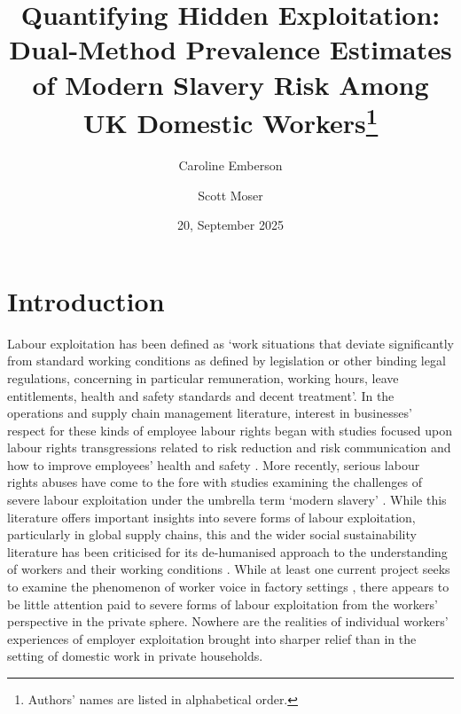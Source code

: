 \documentclass[
  12pt,
  letterpaper,
  DIV=11,
  numbers=noendperiod]{scrartcl}
\title{Quantifying Hidden Exploitation: Dual-Method Prevalence Estimates
of Modern Slavery Risk Among UK Domestic Workers\footnote{Authors' names
  are listed in alphabetical order.}}
\author{Caroline Emberson \and Scott Moser}
\date{20, September 2025}
\theoremstyle{plain}
\theoremstyle{definition}
\renewcommand*\contentsname{Table of contents}
\newcommand\contentsname{Table of contents}
\begin{document}
\maketitle

\renewcommand*\contentsname{Table of contents}
{
\hypersetup{linkcolor=}
\setcounter{tocdepth}{3}
\tableofcontents
}

\newpage

\section{Introduction}\label{introduction}

Labour exploitation has been defined as `work situations that deviate 
significantly from standard working conditions as defined by legislation
or other binding legal regulations, concerning in particular
remuneration, working hours, leave entitlements, health and safety
standards and decent treatment'\autocite[10]{european_union_for_fundamental_rights_severe_2015}. In the operations and supply chain management literature,
interest in businesses' respect for these kinds of employee labour rights began with
studies focused upon labour rights transgressions related to risk
reduction and risk communication and how to improve
employees' health and safety \autocite{chinander_aligning_2001,wolf_operationalizing_2001}. More recently, 
serious labour rights abuses have come to the fore with studies
examining the challenges of severe labour exploitation under the umbrella term `modern slavery' \autocite{gold_modern_2015,new_modern_2015,benstead_horizontal_2018,stevenson_modern_2018}. While this literature
offers important insights into severe forms of labour exploitation, particularly
in global supply chains, this and the wider social sustainability literature has
been criticised for its de-humanised approach to the understanding
of workers and their working conditions \autocite{soundararajan_humanizing_2021}. While at least one current
project seeks to examine the phenomenon of worker voice in factory
settings  \autocite{leverhulme_trust_research_2022}, there appears to be little attention paid to severe forms of labour exploitation from the workers' perspective in the private sphere. Nowhere are the realities of individual workers' experiences of employer exploitation brought into sharper relief than in the setting of domestic
work in private households.
\end{document}
